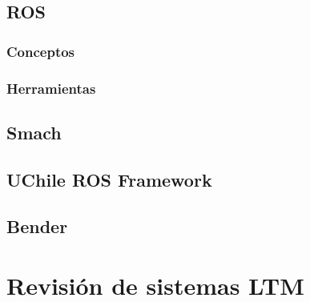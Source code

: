 \subsection{ROS}


\subsubsection{Conceptos}

\subsubsection{Herramientas}


\subsection{Smach}

\subsection{UChile ROS Framework}

\subsection{Bender}



\section{Revisión de sistemas LTM}

